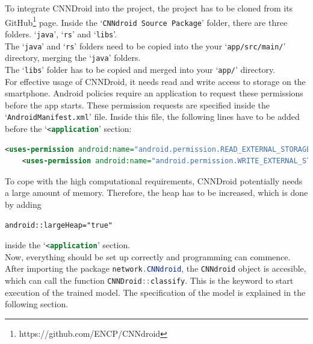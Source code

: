 To integrate CNNDroid into the project, the project has to be cloned from its GitHub\footnote{https://github.com/ENCP/CNNdroid} page. Inside the `\texttt{CNNdroid Source Package}' folder, there are three folders. `\texttt{java}', `\texttt{rs}' and `\texttt{libs}'.\\
The `\texttt{java}' and `\texttt{rs}' folders need to be copied into the your `\texttt{app/src/main/}' directory, merging the `\texttt{java}' folders.\\
The `\texttt{libs}' folder has to be copied and merged into your `\texttt{app/}' directory.\\
For effective usage of CNNDroid, it needs read and write access to storage on the smartphone. Android policies require an application to request these permissions before the app starts. These permission requests are specified inside the `\texttt{AndroidManifest.xml}' file. Inside this file, the following lines have to be added before the `\lstinline[language=XML]{<application}' section:

\begin{lstlisting}[language=XML, basicstyle=\scriptsize]
    <uses-permission android:name="android.permission.READ_EXTERNAL_STORAGE"/>
    <uses-permission android:name="android.permission.WRITE_EXTERNAL_STORAGE"/>
\end{lstlisting}

To cope with the high computational requirements, CNNDroid potentially needs a large amount of memory. Therefore, the heap has to be increased, which is done by adding

\begin{lstlisting}[language=XML, basicstyle=\scriptsize]
    android::largeHeap="true"
\end{lstlisting}
\noindent
inside the `\lstinline[language=XML]{<application}' section.\\
Now, everything should be set up correctly and programming can commence.\\
After importing the package \lstinline[language=Java]{network.CNNdroid}, the \lstinline[language=Java]{CNNdroid} object is accesible, which can call the function \lstinline[language=Java]{CNNDroid::classify}. This is the keyword to start execution of the trained model. The specification of the model is explained in the following section.

